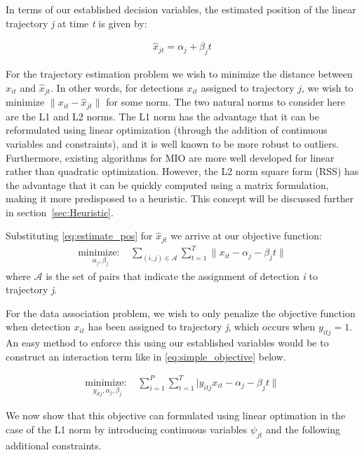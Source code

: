 \documentclass[journal]{IEEEtran}
\begin{document}
In terms of our established decision variables, the estimated position of the linear trajectory \textit{j} at time \textit{t} is given by:

\begin{align}\label{eq:estimate_pos}
	\hat{x}_{jt} =  \alpha_{j} + \beta_{j}t
\end{align}

For the trajectory estimation problem we wish to minimize the distance between $x_{it}$ and $\hat{x}_{jt}$. In other words, for detections $x_{it}$ assigned to trajectory $j$, we wish to minimize $\|x_{it} - \hat{x}_{jt}\|$ for some norm. The two natural norms to consider here are the L1 and L2 norms. The L1 norm has the advantage that it can be reformulated using linear optimization (through the addition of continuous variables and constraints), and it is well known to be more robust to outliers. Furthermore, existing algorithms for MIO are more well developed for linear rather than quadratic optimization. However, the L2 norm square form (RSS) has the advantage that it can be quickly computed using a matrix formulation, making it more predisposed to a heuristic. This concept will be discussed further in section~\ref{sec:Heuristic}.

Substituting \eqref{eq:estimate_pos} for $\hat{x}_{jt}$ we arrive at our objective function:
\begin{align}
\underset{\alpha_{j}, \beta_{j}}{\text{minimize: }} & \sum_{(i,j)\in \mathcal{A}} \sum_{t=1}^{T} \|x_{it} - \alpha_{j} - \beta_{j}t\| 
\end{align}
where $\mathcal{A}$ is the set of pairs that indicate the assignment of detection \textit{i} to trajectory \textit{j}.
 
For the data association problem, we wish to only penalize the objective function when detection $x_{it}$ has been assigned to trajectory \textit{j}, which occurs when $y_{itj}=1$. An easy method to enforce this using our established variables would be to construct an interaction term like in \eqref{eq:simple_objective} below. 

\begin{align}\label{eq:simple_objective}
\underset{y_{itj}, \alpha_{j}, \beta_{j}}{\text{minimize: }} & \sum_{i=1}^{P} \sum_{t=1}^{T} |y_{itj}x_{it} - \alpha_{j} - \beta_{j}t\|
\end{align}

We now show that this objective can formulated using linear optimation in the case of the L1 norm by introducing continuous variables $\psi_{jt}$ and the following additional constraints. 
\end{document}
